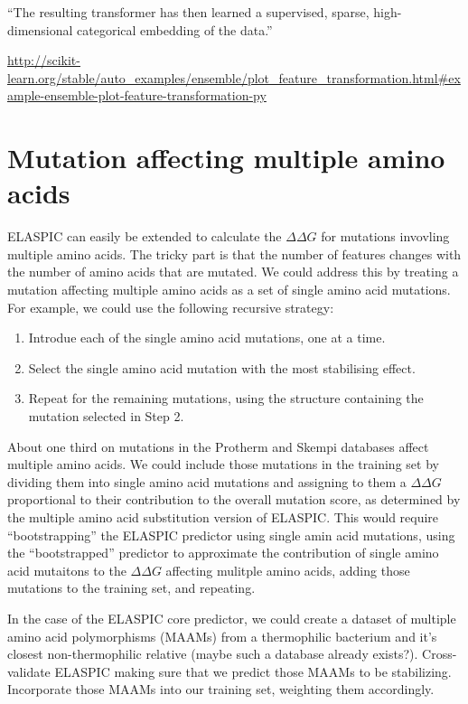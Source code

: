 ``The resulting transformer has then learned a supervised, sparse, high-dimensional categorical embedding of the data.''

\url{http://scikit-learn.org/stable/auto_examples/ensemble/plot_feature_transformation.html#example-ensemble-plot-feature-transformation-py}



\section{Mutation affecting multiple amino acids}

ELASPIC can easily be extended to calculate the $\Delta \Delta G$ for mutations invovling multiple amino acids. The tricky part is that the number of features changes with the number of amino acids that are mutated. We could address this by treating a mutation affecting multiple amino acids as a set of single amino acid mutations. For example, we could use the following recursive strategy:

\begin{enumerate}
    \item Introdue each of the single amino acid mutations, one at a time.
    \item Select the single amino acid mutation with the most stabilising effect.
    \item Repeat for the remaining mutations, using the structure containing the mutation selected in Step 2.
\end{enumerate}

About one third on mutations in the Protherm and Skempi databases affect multiple amino acids. We could include those mutations in the training set by dividing them into single amino acid mutations and assigning to them a $\Delta \Delta G$ proportional to their contribution to the overall mutation score, as determined by the multiple amino acid substitution version of ELASPIC. This would require ``bootstrapping'' the ELASPIC predictor using single amin acid mutations, using the ``bootstrapped'' predictor to approximate the contribution of single amino acid mutaitons to the $\Delta \Delta G$ affecting mulitple amino acids, adding those mutations to the training set, and repeating.

In the case of the ELASPIC core predictor, we could create a dataset of multiple amino acid polymorphisms (MAAMs) from a thermophilic bacterium and it's closest non-thermophilic relative (maybe such a database already exists?). Cross-validate ELASPIC making sure that we predict those MAAMs to be stabilizing. Incorporate those MAAMs into our training set, weighting them accordingly.

